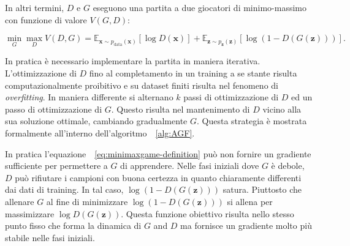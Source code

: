 In altri termini, $D$ e $G$ eseguono una partita a due giocatori di minimo-massimo con funzione di valore $V(G, D)$: 

\begin{equation}
\label{eq:minimaxgame-definition}
\min_G \max_D V(D, G) = \mathbb{E}_{\bm{x} \sim p_{\text{data}}(\bm{x})}[\log D(\bm{x})] + \mathbb{E}_{\bm{z} \sim p_{\bm{z}}(\bm{z})}[\log (1 - D(G(\bm{z})))].
\end{equation}

In pratica è necessario implementare la partita in maniera iterativa. L'ottimizzazione di $D$ fino al completamento in un training a se stante risulta computazionalmente proibitivo e su dataset finiti risulta nel fenomeno di \textit{overfitting}. In maniera differente si alternano $k$ passi di ottimizzazione di $D$ ed un passo di ottimizzazione di $G$. Questo risulta nel mantenimento di $D$ vicino alla sua soluzione ottimale, cambiando gradualmente $G$. Questa strategia è mostrata formalmente all'interno dell'algoritmo~~\ref{alg:AGF}.

In pratica l'equazione~~\ref{eq:minimaxgame-definition} può non fornire un gradiente sufficiente per permettere a $G$ di apprendere. Nelle fasi iniziali dove $G$ è debole, $D$ può rifiutare i campioni con buona certezza in quanto chiaramente differenti dai dati di training. In tal caso, $\log ( 1- D(G(\bm{z})))$ satura. Piuttosto che allenare $G$ al fine di minimizzare $\log (1 - D(G(\bm{z})))$ si allena per massimizzare $\log D(G(\bm{z}))$. 
Questa funzione obiettivo risulta nello stesso punto fisso che forma la dinamica di $G$ and $D$ ma fornisce un gradiente molto più stabile nelle fasi iniziali.

